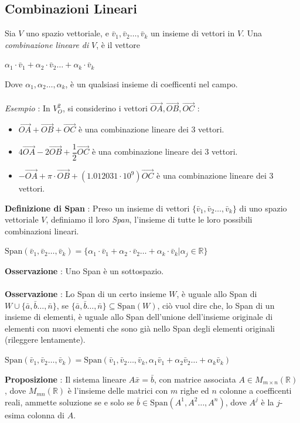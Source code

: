\documentclass[12pt, letterpaper]{article}
\newcommand{\R}{{\mathbb R}}
\newcommand{\acc}{\\\hphantom{}\\}
\newcommand{\Span}{{\text{Span}}}
\begin{document}
\subsection{Combinazioni Lineari}\label{combLin}
Sia \(V\) uno spazio vettoriale, e \(\bar v_1,\bar v_2\dots, \bar v_k\) un insieme di vettori in \(V\). 
Una \textit{combinazione lineare di }\(V\), è il vettore \begin{center}
    \(\alpha_1\cdot\bar v_1+\alpha_2\cdot\bar v_2\dots+ \alpha_k\cdot\bar v_k\)
\end{center}
Dove \(\alpha_1,\alpha_2\dots,\alpha_k\), è un qualsiasi insieme di coefficenti nel campo.\acc \textit{Esempio} : 
In \(V_O^2\), si considerino i vettori \(\vec{OA},\vec{OB},\vec{OC}\) : \begin{itemize}
    \item \(\vec{OA}+\vec{OB}+\vec{OC}\) è una combinazione lineare dei 3 vettori.
    \item \(4\vec{OA}-2\vec{OB}+\dfrac{1}{2}\vec{OC}\) è una combinazione lineare dei 3 vettori.
    \item \(-\vec{OA}+\pi\cdot \vec{OB}+(1.012031\cdot 10^9)\vec{OC}\) è una combinazione lineare dei 3 vettori.
\end{itemize}
\textbf{Definizione di Span} : Preso un insieme di vettori \(\{\bar v_1,\bar v_2\dots, \bar v_k\}\) di 
uno spazio vettoriale \(V\), definiamo il loro \textit{Span}, l'insieme di tutte le loro possibili combinazioni lineari.
\begin{center}
    \(\Span(\bar v_1,\bar v_2\dots, \bar v_k)=\{\alpha_1\cdot\bar v_1+\alpha_2\cdot\bar v_2\dots+ \alpha_k\cdot\bar v_k|\alpha_j\in \R\}\)
\end{center}
\textbf{Osservazione} : Uno Span è un sottospazio.\acc 
\textbf{Osservazione} : Lo Span di un certo insieme \(W\), è uguale allo Span di \(W\cup \{\bar a,\bar b\dots, \bar n\}\), se 
\(\{\bar a,\bar b\dots, \bar n\}\subseteq \Span(W)\), ciò vuol dire che, lo Span 
di un insieme di elementi, è uguale allo Span dell'unione dell'insieme originale di elementi con nuovi 
elementi che sono già nello Span degli elementi originali (rileggere lentamente).\begin{center}
    \(
    \Span(\bar v_1,\bar v_2\dots, \bar v_k)= \Span(\bar v_1,\bar v_2\dots, \bar v_k,\alpha_1\bar v_1+\alpha_2\bar v_2\dots+ \alpha_k\bar v_k)
    \)
\end{center}
\textbf{Proposizione }: Il sistema lineare \(A\bar x = \bar b\), con matrice associata \(A\in M_{m\times n}(\R)\), dove 
\(M_{mn}(\R)\) è l'insieme delle matrici con \(m\) righe ed \(n\) colonne a coefficenti reali, ammette 
soluzione se e solo se \(\bar b \in \Span(A^1,A^2\dots, A^n)\), dove \(A^j\) è la \(j\)-esima colonna di \(A\). 
\end{document}
